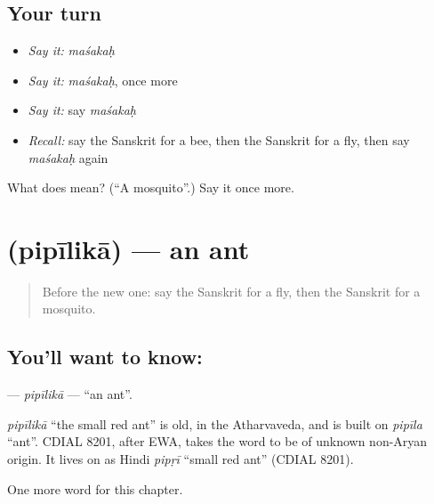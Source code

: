 \subsection*{Your turn}
\begin{itemize}
\raggedright
  \item \emph{Say it:} \emph{maśakaḥ}
  \item \emph{Say it:} \emph{maśakaḥ}, once more
  \item \emph{Say it:} say \emph{maśakaḥ}
  \item \emph{Recall:} say the Sanskrit for a bee, then the Sanskrit for a fly, then say \emph{maśakaḥ} again
\end{itemize}

\begin{tcolorbox}[breakable,colback=teal!4,colframe=teal!35!black,title={Before you move on}]
What does  mean? (\textquotedblleft{}A mosquito\textquotedblright{}.) Say it once more.
\end{tcolorbox}
\section[\texorpdfstring{\sk{पिपीलिका} (pipīlikā)}{पिपीलिका (pipīlikā)}]{ (pipīlikā) — an ant}

\label{lesson:SA-C115-pipilika}



\begin{quote}
Before the new one: say the Sanskrit for a fly, then the Sanskrit for a mosquito.
\end{quote}

\subsection*{You'll want to know: }
\textbf{} — \emph{pipīlikā} — \textquotedblleft{}an ant\textquotedblright{}.

\begin{cousinweb}
\emph{pipīlikā} \textquotedblleft{}the small red ant\textquotedblright{} is old, in the Atharvaveda, and is built on \emph{pipīla} \textquotedblleft{}ant\textquotedblright{}. CDIAL 8201, after EWA, takes the word to be of unknown non-Aryan origin. It lives on as Hindi \emph{pipṛī} \textquotedblleft{}small red ant\textquotedblright{} (CDIAL 8201).
\end{cousinweb}

\begin{grammarlens}[title={What you've built}]
One more word for this chapter.
\end{grammarlens}

